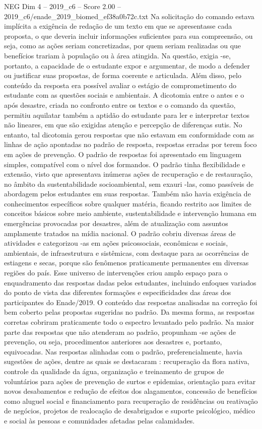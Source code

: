 \begin{textsample}{NEG Dim 4 – 2019\_c6 – Score 2.00 – 2019\_c6/enade\_2019\_biomed\_ef38a0b72c.txt}
Na solicitação do comando estava implícita a exigência de redação de um texto em que se apresentasse cada proposta, o que deveria incluir informações suficientes para sua compreensão, ou seja, como as ações seriam concretizadas, por quem seriam realizadas ou que benefícios trariam à população ou à área atingida.
Na questão, exigia -se, portanto, a capacidade de o estudante expor e argumentar, de modo a defender ou justificar suas propostas, de forma coerente e articulada.
Além disso, pelo conteúdo da resposta era possível avaliar o estágio de comprometimento do estudante com as questões sociais e ambientais.
A dicotomia entre o antes e o após desastre, criada no confronto entre os textos e o comando da questão, permitiu aquilatar também a aptidão do estudante para ler e interpretar textos não lineares, em que são exigidas atenção e percepção de diferenças sutis.
No entanto, tal dicotomia gerou respostas que não estavam em conformidade com as linhas de ação apontadas no padrão de resposta, respostas erradas por terem foco em ações de prevenção.
O padrão de respostas foi apresentado em linguagem simples, compatível com o nível dos formandos.
O padrão tinha flexibilidade e extensão, visto que apresentava inúmeras ações de recuperação e de restauração, no âmbito da sustentabilidade socioambiental, sem exauri -las, como passíveis de abordagem pelos estudantes em suas respostas.
Também não havia exigência de conhecimentos específicos sobre qualquer matéria, ficando restrito aos limites de conceitos básicos sobre meio ambiente, sustentabilidade e intervenção humana em emergências provocadas por desastres, além de atualização com assuntos amplamente tratados na mídia nacional.
O padrão cobriu diversas áreas de atividades e categorizou -as em ações psicossociais, econômicas e sociais, ambientais, de infraestrutura e sistêmicas, com destaque para as ocorrências de estiagens e secas, porque são fenômenos praticamente permanentes em diversas regiões do país.
Esse universo de intervenções criou amplo espaço para o enquadramento das respostas dadas pelos estudantes, incluindo enfoques variados do ponto de vista das diferentes formações e especificidades das áreas dos participantes do Enade/2019.
O conteúdo das respostas analisadas na correção foi bem coberto pelas propostas sugeridas no padrão.
Da mesma forma, as respostas corretas cobriram praticamente todo o espectro levantado pelo padrão.
Na maior parte das respostas que não atenderam ao padrão, propunham -se ações de prevenção, ou seja, procedimentos anteriores aos desastres e, portanto, equivocadas.
Nas respostas alinhadas com o padrão, preferencialmente, havia sugestões de ações, dentre as quais se destacaram : recuperação da flora nativa, controle da qualidade da água, organização e treinamento de grupos de voluntários para ações de prevenção de surtos e epidemias, orientação para evitar novos desabamentos e redução de efeitos dos alagamentos, concessão de benefícios como aluguel social e financiamento para recuperação de residências ou reativação de negócios, projetos de realocação de desabrigados e suporte psicológico, médico e social às pessoas e comunidades afetadas pelas calamidades.

\end{textsample}
